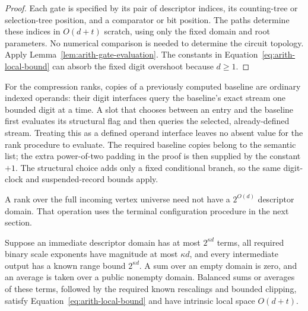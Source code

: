 \begin{proof}
Each gate is specified by its pair of descriptor indices, its
counting-tree or selection-tree position, and a comparator or bit
position.  The paths determine these indices in $O(d+t)$ scratch,
using only the fixed domain and root parameters.  No numerical
comparison is needed to determine the circuit topology.  Apply
Lemma~\ref{lem:arith-gate-evaluation}.  The constants in
Equation~\eqref{eq:arith-local-bound} can absorb the fixed digit
overshoot because $d\geq1$.
\end{proof}

For the compression ranks, copies of a previously computed baseline
are ordinary indexed operands: their digit interfaces query the
baseline's exact stream one bounded digit at a time.  A slot that
chooses between an entry and the baseline first evaluates its
structural flag and then queries the selected, already-defined stream.
Treating this as a defined operand interface leaves no absent value
for the rank procedure to evaluate.
The required baseline copies belong to the semantic list; the extra
power-of-two padding in the proof is then supplied by the constant
$+1$.  The structural choice adds only a fixed conditional branch,
so the same digit-clock and suspended-record bounds apply.

A rank over the full incoming vertex universe need not have a
$2^{O(d)}$ descriptor domain.  That operation uses the terminal
configuration procedure in the next section.

\begin{lemma}
\label{lem:arith-sums-scales}
Suppose an immediate descriptor domain has at most $2^{\kappa d}$
terms, all required binary scale exponents have magnitude at most
$\kappa d$, and every intermediate output has a known range bound
$2^{\kappa d}$.  A sum over an empty domain is zero, and an average
is taken over a public nonempty domain.  Balanced sums or averages of these terms, followed
by the required known rescalings and bounded clipping, satisfy
Equation~\eqref{eq:arith-local-bound} and have intrinsic local
space $O(d+t)$.
\end{lemma}


